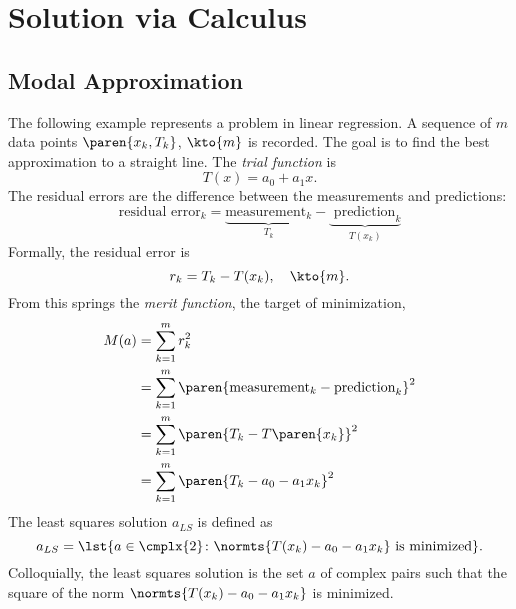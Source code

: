 \chapter{Solution via Calculus}

\section{Modal Approximation}  %
The following example represents a problem in linear regression. A sequence of $m$ data points $\paren{x_{k}, T_{k}}$,  $\kto{m}$  is recorded. The goal is to find the best approximation to a straight line. The \emph{trial function} is
  \begin{equation*}   %
    T(x) = a_{0} + a_{1} x .
    \label{eq:lr trial}
  \end{equation*}
The residual errors are the difference between the measurements and predictions:\\
  \begin{equation*}   %
      \text{residual error}_{k} = \underbrace{\text{measurement}_{k}}_{T_{k}} - \underbrace{\text{ prediction}_{k}}_{T(x_{k})}
  \end{equation*}
Formally, the residual error is
  \begin{equation*}   %
    r_{k} = T_{k} - T(x_{k}), \quad \kto{m}.
  \end{equation*}
From this springs the \emph{merit function}, the target of minimization,
  \begin{equation}   %
  \begin{split}
    M(a) 
      &= \sum_{k=1}^{m} r_{k}^{2} \\
      &= \sum_{k=1}^{m} \paren{\text{measurement}_{k} - \text{prediction}_{k}}^{2} \\
      &= \sum_{k=1}^{m} \paren{T_{k} - T\paren{x_{k}}}^{2} \\
      &= \sum_{k=1}^{m} \paren{T_{k} - a_{0} - a_{1} x_{k}}^{2}
    \label{eqn:merit}
  \end{split}
  \end{equation}
The least squares solution $a_{LS}$ is defined as 
  \begin{equation*}   %
    a_{LS} = \lst{a \in \cmplx{2} \colon \normts{T(x_{k}) - a_{0} - a_{1} x_{k}} \text{ is minimized} }.
  \end{equation*}
Colloquially, the least squares solution is the set $a$ of complex pairs such that the square of the norm $\normts{T(x_{k}) - a_{0} - a_{1} x_{k}}$ is minimized.

